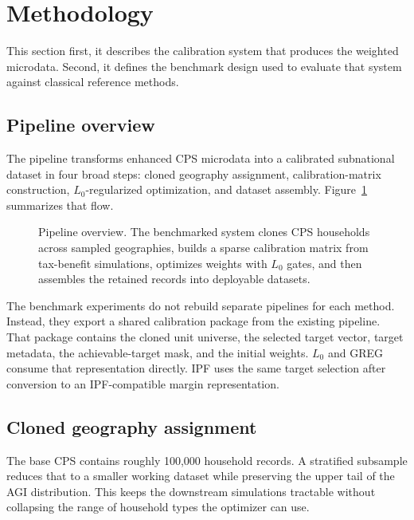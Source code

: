 \section{Methodology}
\label{sec:methodology}

This section first, it describes the calibration system that produces the weighted
microdata. Second, it defines the benchmark design used to evaluate that system against classical
reference methods.

\subsection{Pipeline overview}

The pipeline transforms enhanced CPS microdata into a calibrated subnational dataset in four broad
steps: cloned geography assignment, calibration-matrix construction, $L_0$-regularized
optimization, and dataset assembly. Figure~\ref{fig:pipeline} summarizes that flow.

\begin{figure}[ht]
    \centering
    \caption{Pipeline overview. The benchmarked system clones CPS households across sampled
    geographies, builds a sparse calibration matrix from tax-benefit simulations, optimizes weights
    with $L_0$ gates, and then assembles the retained records into deployable datasets.}
    \label{fig:pipeline}
\end{figure}

The benchmark experiments do not rebuild separate pipelines for each method. Instead, they export a
shared calibration package from the existing pipeline. That package contains the cloned unit
universe, the selected target vector, target metadata, the achievable-target mask, and the initial
weights. $L_0$ and GREG consume that representation directly. IPF uses the same target selection
after conversion to an IPF-compatible margin representation.

\subsection{Cloned geography assignment}
\label{sec:cloning}

The base CPS contains roughly 100{,}000 household records. A stratified subsample reduces that to a
smaller working dataset while preserving the upper tail of the AGI distribution. This keeps the
downstream simulations tractable without collapsing the range of household types the optimizer can
use.

